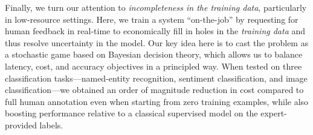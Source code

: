 Finally, we turn our attention to \textit{incompleteness in the training data}, particularly in low-resource settings.
Here, we train a system ``on-the-job'' by requesting for human feedback in real-time to economically fill in holes in the \textit{training data} and thus resolve uncertainty in the model.
Our key idea here is to cast the problem as a stochastic game based on Bayesian decision theory, which allows us to balance latency, cost, and accuracy objectives in a principled way.
When tested on three classification tasks---named-entity recognition, sentiment classification, and image classification---we obtained an order of magnitude reduction in cost compared to full human annotation even when starting from zero training examples, while also boosting performance relative to a classical supervised model on the expert-provided labels.
